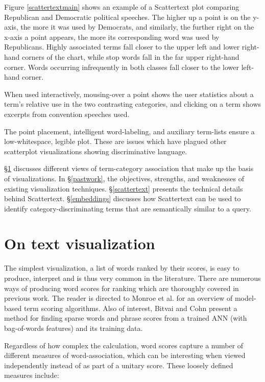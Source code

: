 \documentclass[11pt,a4paper]{article}
\begin{document}
Figure \ref{scattertextmain} shows an example of a Scattertext plot comparing Republican and Democratic political speeches.  The higher up a point is on the y-axis, the more it was used by Democrats, and similarly, the further right on the x-axis a point appears, the more its corresponding word was used by Republicans.  Highly associated terms fall closer to the upper left and lower right-hand corners of the chart, while stop words fall in the far upper right-hand corner.  Words occurring infrequently in both classes fall closer to the lower left-hand corner.  

When used interactively, mousing-over a point shows the user statistics about a term's relative use in the two contrasting categories, and clicking on a term shows excerpts from convention speeches used.  

The point placement, intelligent word-labeling, and auxiliary term-lists ensure a low-whitespace, legible plot.  These are issues which have plagued other scatterplot visualizations showing discriminative language.

\S\ref{onviz} discusses different views of term-category association that make up the basis of visualizations.  In \S\ref{pastwork}, the objectives, strengths, and weaknesses of existing visualization techniques. \S\ref{scattertext} presents the technical details behind Scattertext. \S\ref{embeddings} discusses how Scattertext can be used to identify category-discriminating terms that are semantically similar to a query.
\section{On text visualization}
\label{onviz}
The simplest visualization, a list of words ranked by their scores, is easy to produce, interpret and is thus very common in the literature.  There are numerous ways of producing word scores for ranking which are thoroughly covered in previous work.  The reader is directed to Monroe et al.  for an overview of model-based term scoring algorithms.  Also of interest, Bitvai and Cohn  present a method for finding sparse words and phrase scores from a trained ANN (with bag-of-words features) and its training data. 

Regardless of how complex the calculation, word scores capture a number of different measures of word-association, which can be interesting when viewed independently instead of as part of a unitary score.  These loosely defined measures include:  \vspace{-0.1in}
\end{document}
